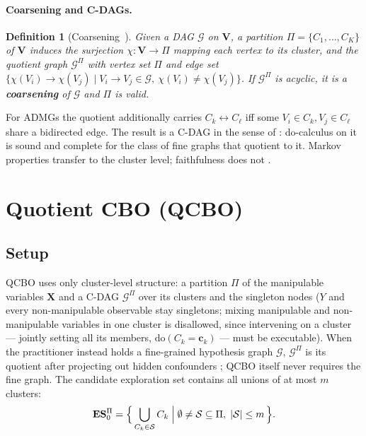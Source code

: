 \documentclass[twoside]{article}
\newtheorem{definition}{Definition}
\newcommand{\doo}{\mathrm{do}}
\newcommand{\QCBO}{\textsc{QCBO}}
\newcommand{\CBO}{\textsc{CBO}}
\newcommand{\Gg}{\mathcal{G}}
\newcommand{\Gq}{\mathcal{G}^{\Pi}}
\newcommand{\ESpi}{\mathbf{ES}^{\Pi}}
\begin{document}
\paragraph{Coarsening and C-DAGs.}
\begin{definition}[Coarsening~\citep{madaleno2026coarsening}]
\label{def:coarsening}
Given a DAG $\Gg$ on $\mathbf{V}$, a partition $\Pi=\{C_1,\ldots,C_K\}$ of $\mathbf{V}$ induces the surjection $\chi:\mathbf{V}\to\Pi$ mapping each vertex to its cluster, and the quotient graph $\Gq$ with vertex set $\Pi$ and edge set $\{\chi(V_i)\to\chi(V_j) \mid V_i\to V_j\in\Gg,\ \chi(V_i)\neq\chi(V_j)\}$. If $\Gq$ is acyclic, it is a \textbf{coarsening} of $\Gg$ and $\Pi$ is valid. 
\end{definition}
For ADMGs the quotient additionally carries $C_k\leftrightarrow C_\ell$ iff some $V_i\in C_k,V_j\in C_\ell$ share a bidirected edge. The result is a C-DAG in the sense of \citet{anand2023cdag}: do-calculus on it is sound and complete for the class of fine graphs that quotient to it. Markov properties transfer to the cluster level; faithfulness does not \citep{wahl2024foundations}.

\section{Quotient \CBO{} (\QCBO{})}
\label{sec:method}

\subsection{Setup}
\label{sec:setup}
\QCBO{} uses only cluster-level structure: a partition $\Pi$ of the manipulable variables $\mathbf{X}$ and a C-DAG $\Gq$ over its clusters and the singleton nodes ($Y$ and every non-manipulable observable stay singletons; mixing manipulable and non-manipulable variables in one cluster is disallowed, since intervening on a cluster --- jointly setting all its members, $\doo(C_k=\mathbf{c}_k)$ --- must be executable). When the practitioner instead holds a fine-grained hypothesis graph $\Gg$, $\Gq$ is its quotient after projecting out hidden confounders \citep{lee2019latent}; \QCBO{} itself never requires the fine graph. The candidate exploration set contains all unions of at most $m$ clusters:
\begin{equation}
  \label{eq:ccbo_exploration}
  \ESpi_{0} = \Bigl\{\,\bigcup_{C_k\in\mathcal{S}}C_k \;\Big|\;
  \emptyset\neq\mathcal{S}\subseteq\Pi,\;|\mathcal{S}|\leq m\,\Bigr\}.
\end{equation}
\end{document}
